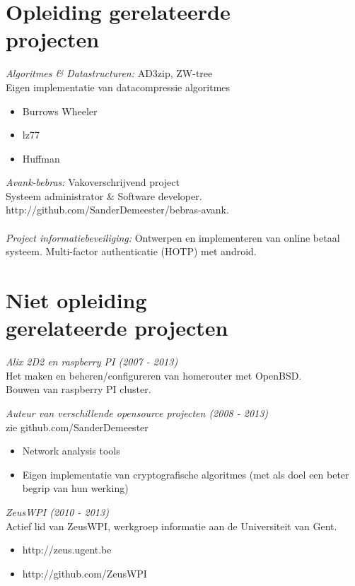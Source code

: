 \documentclass[margin, 10pt]{res} %
\begin{document}
\begin{resume}
\section{Opleiding gerelateerde \\ projecten} 

{\sl Algoritmes \& Datastructuren:} AD3zip, ZW-tree \\
Eigen implementatie van datacompressie algoritmes
\begin{itemize}
\item Burrows Wheeler
\item lz77
\item Huffman
\end{itemize}
{\sl Avank-bebras:} Vakoverschrijvend project \\
Systeem administrator \& Software developer. \\
http://github.com/SanderDemeester/bebras-avank.
\\ \\
{\sl Project informatiebeveiliging:} Ontwerpen en implementeren van online betaal systeem. Multi-factor authenticatie (HOTP) met android.
 
 
\section{Niet opleiding\\ gerelateerde projecten}

{\sl Alix 2D2 en raspberry PI (2007 - 2013)} \\
Het maken en beheren/configureren van homerouter met OpenBSD. \\
Bouwen van raspberry PI cluster.

{\sl Auteur van verschillende opensource projecten (2008 - 2013)} \\
zie github.com/SanderDemeester
\begin{itemize} \itemsep -2pt
\item Network analysis tools
\item Eigen implementatie van cryptografische algoritmes (met als doel een beter begrip van hun werking)
\end{itemize}

{\sl ZeusWPI (2010 - 2013)} \\
Actief lid van ZeusWPI, werkgroep informatie aan de Universiteit van Gent.
\begin{itemize} \itemsep -2pt
\item{http://zeus.ugent.be}
\item{http://github.com/ZeusWPI}
\end{itemize}


\end{resume}
\end{document}
